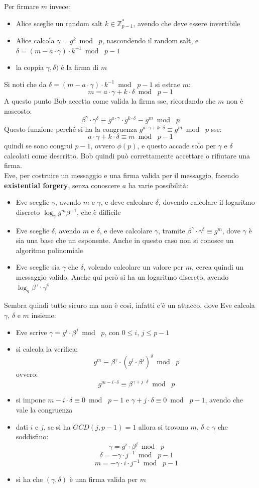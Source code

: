 \documentclass[a4paper,12pt, oneside]{book}
\begin{document}
Per firmare $m$ invece:
\begin{itemize}
  \item Alice sceglie un random salt $k\in\mathbb{Z}_{p-1}^*$, avendo che deve
  essere invertibile
  \item Alice calcola $\gamma=g^k\bmod\,\,p$, nascondendo il random salt, e
  $\delta=(m-a\cdot \gamma)\cdot k^{-1}\bmod \,\,p-1$
  \item la coppia $\gamma,\delta)$ è la firma di $m$
\end{itemize}
Si noti che da  $\delta=(m-a\cdot \gamma)\cdot k^{-1}\bmod \,\,p-1$ si estrae
$m$:
\[m=a\cdot \gamma+k\cdot \delta\bmod \,\,p-1\]
A questo punto Bob accetta come valida la firma sse, ricordando che $m$ non è
nascosto: 
\[\beta^\gamma\cdot \gamma^\delta\equiv g^{a\cdot \gamma}\cdot
  g^{k\cdot\delta}\equiv g^m\bmod\,\,p\]
Questo funzione perché si ha la congruenza $g^{a\cdot \gamma+k\cdot\delta}\equiv
g^m\bmod \,\,p$ sse: 
\[a\cdot \gamma+k\cdot \delta\equiv m\bmod\,\,p-1\]
quindi se sono congrui $p-1$, ovvero $\phi(p)$,
e questo accade solo per $\gamma$ e $\delta$ calcolati come descritto. Bob
quindi può correttamente accettare o rifiutare una firma.\\
Eve, per costruire un messaggio e una firma valida per il messaggio, facendo
\textbf{existential forgery}, senza conoscere $a$ ha varie possibilità:
\begin{itemize}
  \item Eve sceglie $\gamma$, avendo $m$ e $\gamma$, e deve calcolare $\delta$,
  dovendo calcolare il logaritmo discreto $\log_\gamma g^m\beta^{-\gamma}$, che
  è difficile
  \item Eve sceglie $\delta$, avendo $m$ e $\delta$, e deve calcolare $\gamma$,
  tramite $\beta^\gamma\cdot \gamma^\delta\equiv g^m$, dove $\gamma$ è sia una
  base che un esponente. Anche in questo caso non si conosce un algoritmo
  polinomiale
  \item Eve sceglie sia $\gamma$ che $\delta$, volendo calcolare un valore per
  $m$, cerca quindi un messaggio valido. Anche qui però si ha un logaritmo
  discreto, avendo $\log_g\beta^\gamma\cdot \gamma^\delta$
\end{itemize}
Sembra quindi tutto sicuro ma non è così, infatti c'è un attacco, dove Eve
calcola $\gamma$, $\delta$ e $m$ insieme: 
\begin{itemize}
  \item Eve scrive $\gamma=g^i\cdot \beta^j\bmod\,\,p$, con $0\leq i$, $j\leq
  p-1$ 
  \item si calcola la verifica:
  \[g^m\equiv \beta^\gamma\cdot (g^i\cdot \beta^j)^\delta\bmod\,\,p\]
  ovvero:
  \[g^{m-i\cdot\delta}\equiv \beta^{\gamma+j\cdot \delta}\bmod\,\,p\]
  \item si impone $m-i\cdot \delta\equiv 0\bmod\,\,p-1$ e $\gamma+j\cdot
  \delta\equiv 0\bmod\,\,p-1$, avendo che vale la congruenza
  \item dati $i$ e $j$, se si ha $GCD(j,p-1)=1$ allora si trovano $m$, $\delta$
  e $\gamma$ che soddisfino:
  \[\gamma=g^i\cdot \beta^j\bmod\,\,p\]
  \[\delta=-\gamma\cdot j^{-1}\bmod\,\,p-1\]
  \[m=-\gamma\cdot i\cdot j^{-1}\bmod\,\,p-1\]
  \item si ha che $(\gamma,\delta)$ è una firma valida per $m$
\end{itemize}
\end{document}
